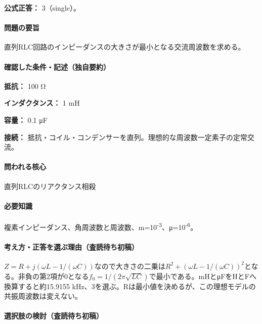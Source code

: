 \textbf{公式正答：} 3（single）。

\paragraph{問題の要旨} 直列RLC回路のインピーダンスの大きさが最小となる交流周波数を求める。

\paragraph{確認した条件・記述（独自要約）}\mbox{}\par

\noindent\textbf{抵抗：} 100 Ω\par

\noindent\textbf{インダクタンス：} 1 mH\par

\noindent\textbf{容量：} 0.1 μF\par

\noindent\textbf{接続：} 抵抗・コイル・コンデンサーを直列。理想的な周波数一定素子の定常交流。\par

\paragraph{問われる核心} 直列RLCのリアクタンス相殺

\paragraph{必要知識} 複素インピーダンス、角周波数と周波数、m=\allowbreak{}10\textsuperscript{-3}、μ=10\textsuperscript{-6}。

\paragraph{考え方・正答を選ぶ理由（査読待ち初稿）} \(Z=R+j(\omega L-1/(\omega C))\)なので大きさの二乗は\(R^2+(\omega L-1/(\omega C))^2\)となる。非負の第2項が0となる\(f_0=1/(2\pi\sqrt{LC})\)で最小である。mHとμFをHとFへ換算すると約15.9155 kHz、3を選ぶ。Rは最小値を決めるが、この理想モデルの共振周波数は変えない。

\paragraph{選択肢の検討（査読待ち初稿）}\mbox{}\par


